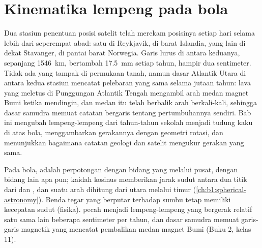 \chapter{Kinematika lempeng pada bola}\label{ch:b1:plate-kinematics}

Dua stasiun penentuan posisi satelit telah merekam posisinya setiap hari selama lebih dari seperempat abad: satu di Reykjavik, di barat Islandia, yang lain di dekat Stavanger, di pantai barat Norwegia. Garis lurus di antara keduanya, sepanjang \qty{1546}{km}, bertambah \qty{17.5}{mm} setiap tahun, hampir dua sentimeter. Tidak ada yang tampak di permukaan tanah, namun dasar Atlantik Utara di antara kedua stasiun mencatat pelebaran yang sama selama jutaan tahun: lava yang meletus di Punggungan Atlantik Tengah mengambil arah medan magnet Bumi ketika mendingin, dan medan itu telah berbalik arah berkali-kali, sehingga dasar samudra memuat catatan bergaris tentang pertumbuhannya sendiri. Bab ini mengubah lempeng-lempeng dari tahun-tahun sekolah menjadi tudung kaku di atas bola, menggambarkan gerakannya dengan geometri rotasi, dan menunjukkan bagaimana catatan geologi dan satelit mengukur gerakan yang sama.

\begin{recall}
Pada bola,  adalah perpotongan dengan bidang yang melalui pusat,  dengan bidang lain apa pun; kaidah kosinus memberikan jarak sudut antara dua titik dari  dan , dan  suatu arah dihitung dari utara melalui timur (\cref{ch:b1:spherical-astronomy}). Benda tegar yang berputar terhadap sumbu tetap memiliki kecepatan sudut (fisika).  pecah menjadi lempeng-lempeng yang bergerak relatif satu sama lain beberapa sentimeter per tahun, dan dasar samudra memuat garis-garis magnetik yang mencatat pembalikan medan magnet Bumi (Buku 2, kelas 11).
\end{recall}

